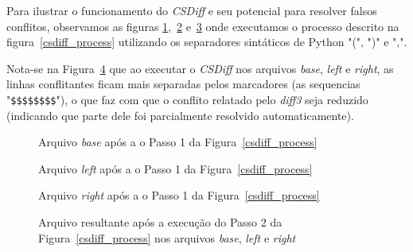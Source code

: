 Para ilustrar o funcionamento do \emph{CSDiff} e seu potencial para resolver falsos conflitos, observamos as figuras
\ref{base_marcadores},~\ref{left_marcadores} e~\ref{right_marcadores}
onde executamos o processo descrito na figura~\ref{csdiff_process} utilizando os
separadores sintáticos de Python "(", ")" e ",".

Nota-se na Figura~\ref{diff3_marcadores} que ao executar o \emph{CSDiff} nos arquivos \emph{base}, \emph{left} e \emph{right}, as linhas conflitantes ficam
mais separadas pelos marcadores (as sequencias "\verb|$$$$$$$$|"), o que faz com que o
conflito relatado pelo \emph{diff3} seja reduzido (indicando que parte dele foi
parcialmente resolvido automaticamente).

\begin{figure}[ht]
	\begin{center}
		
		\caption{Arquivo \emph{base} após a o Passo 1 da Figura~\ref{csdiff_process}}\label{base_marcadores}
	\end{center}
\end{figure}

\begin{figure}[ht]
	\begin{center}
		
		\caption{Arquivo \emph{left} após a o Passo 1 da Figura~\ref{csdiff_process}}\label{left_marcadores}
	\end{center}
\end{figure}

\begin{figure}[ht]
	\begin{center}
		
		\caption{Arquivo \emph{right} após a o Passo 1 da Figura~\ref{csdiff_process}}\label{right_marcadores}
	\end{center}
\end{figure}

\begin{figure}[ht]
	\begin{center}
		
		\caption{Arquivo resultante após a execução do Passo 2 da Figura~\ref{csdiff_process} nos arquivos
			\emph{base}, \emph{left} e \emph{right}}\label{diff3_marcadores}
	\end{center}
\end{figure}


